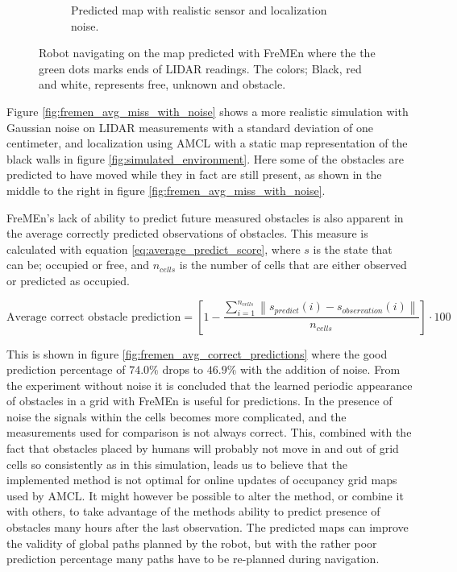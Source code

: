 \begin{figure}[htbp]
\begin{subfigure}[t]{0.49\textwidth}
        \caption{Predicted map with realistic sensor and localization noise.}
        \label{fig:fremen_sim_with_noise}
    \end{subfigure}
    \caption{Robot navigating on the map predicted with FreMEn where the the green dots marks ends of LIDAR readings. The colors; Black, red and white, represents free, unknown and obstacle.}
\end{figure}

Figure \ref{fig:fremen_avg_miss_with_noise} shows a more realistic simulation with Gaussian noise on LIDAR measurements with a standard deviation of one centimeter, and localization using AMCL with a static map representation of the black walls in figure \ref{fig:simulated_environment}.
Here some of the obstacles are predicted to have moved while they in fact are still present, as shown in the middle to the right in figure \ref{fig:fremen_avg_miss_with_noise}.

FreMEn's lack of ability to predict future measured obstacles is also apparent in the average correctly predicted observations of obstacles. This measure is calculated with equation \ref{eq:average_predict_score}, where $s$ is the state that can be; occupied or free, and $n_{cells}$ is the number of cells that are either observed or predicted as occupied.

\begin{equation}
\text{Average correct obstacle prediction} = \left[1- \frac{\sum\limits_{i=1}^{n_{cells}} \left\|s_{predict}(i)-s_{observation}(i)\right\|}{n_{cells}}
\right]\cdot 100
\label{eq:average_predict_score}
\end{equation} 

This is shown in figure \ref{fig:fremen_avg_correct_predictions} where the good prediction percentage of $74.0\%$ drops to $46.9\%$ with the addition of noise.
From the experiment without noise it is concluded that the learned periodic appearance of obstacles in a grid with FreMEn is useful for predictions.
In the presence of noise the signals within the cells becomes more complicated, and the measurements used for comparison is not always correct.
This, combined with the fact that obstacles placed by humans will probably not move in and out of grid cells so consistently as in this simulation, leads us to believe that the implemented method is not optimal for online updates of occupancy grid maps used by AMCL.
It might however be possible to alter the method, or combine it with others, to take advantage of the methods ability to predict presence of obstacles many hours after the last observation.
The predicted maps can improve the validity of global paths planned by the robot, but with the rather poor prediction percentage many paths have to be re-planned during navigation.

